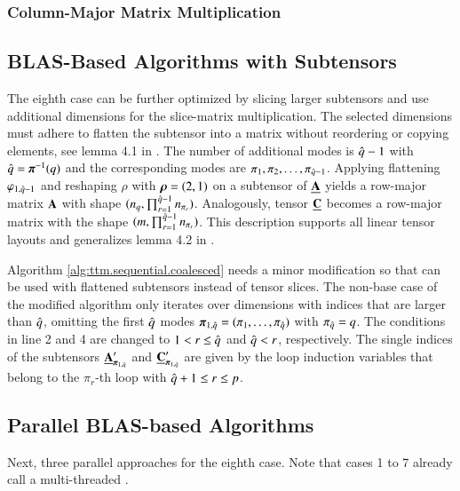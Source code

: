 \subsubsection{Column-Major Matrix Multiplication}



\subsection{BLAS-Based Algorithms with Subtensors}
\label{sec:design:blas.based.algorithm.subtensors}
The eighth case can be further optimized by slicing larger subtensors and use additional dimensions for the slice-matrix multiplication.
The selected dimensions must adhere to flatten the subtensor into a matrix without reordering or copying elements, see lemma 4.1 in \cite{li:2015:input}.
The number of additional modes is $\hat{q}-1$ with $\hat{q} = \boldsymbol{\pi}^{-1}(q)$ and the corresponding modes are $\pi_1,\pi_2,\dots,\pi_{\hat{q}-1}$.
Applying flattening $\varphi_{1,\hat{q}-1}$ and reshaping $\rho$ with $\boldsymbol{\rho} = (2,1)$ on a subtensor of $\underline{\mathbf{A}}$ yields a row-major matrix $\mathbf{A}$ with shape $(n_q,\prod_{r=1}^{\hat{q}-1} n_{\pi_r})$.
Analogously, tensor $\underline{\mathbf{C}}$ becomes a row-major matrix with the shape $(m, \prod_{r=1}^{\hat{q}-1} n_{\pi_r})$.
This description supports all linear tensor layouts and generalizes lemma 4.2 in \cite{li:2015:input}.

Algorithm \ref{alg:ttm.sequential.coalesced} needs a minor modification so that  can be used with flattened subtensors instead of tensor slices.
The non-base case of the modified algorithm only iterates over dimensions with indices that are larger than $\hat{q}$, omitting the first $\hat{q}$ modes $\boldsymbol{\pi}_{1,\hat{q}} = (\pi_1, \dots, \pi_{\hat{q}})$ with $\pi_{\hat{q}} = q$.
The conditions in line 2 and 4 are changed to $1 < r \leq \hat{q}$ and $\hat{q} < r$, respectively.
The single indices of the subtensors $\underline{\mathbf{A}}_{\boldsymbol{\pi}_{1,\hat{q}}}'$ and $\underline{\mathbf{C}}_{\boldsymbol{\pi}_{1,\hat{q}}}'$ are given by the loop induction variables that belong to the $\pi_r$-th loop with $\hat{q}+1 \leq r \leq p$.  
 
\subsection{Parallel BLAS-based Algorithms}
\label{subsec:parallel.multi-loops}
Next, three parallel approaches for the eighth case.
Note that cases 1 to 7 already call a multi-threaded .


